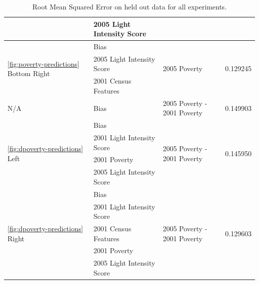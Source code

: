 \documentclass[10pt, letterpaper]{article}
\theoremstyle{plain}
\theoremstyle{definition}
\begin{document}
\begin{table}
\begin{tabular}{| l | l | l | l |}
                                                  & 2005 Light Intensity Score    &                               &                           \\
  \hline
  \multirow{3}{*}{\ref{fig:poverty-predictions} Bottom Right}  & Bias                          & \multirow{3}{*}{2005 Poverty} & \multirow{3}{*}{0.129245} \\
                                                  & 2005 Light Intensity Score    &                               &                           \\
                                                  & 2001 Census Features          &                               &                           \\
  \hline
  N/A                                             & Bias                          & 2005 Poverty - 2001 Poverty   & 0.149903                  \\
  \hline
  \multirow{4}{*}{\ref{fig:dpoverty-predictions} Left}        & Bias                          & \multirow{4}{*}{2005 Poverty - 2001 Poverty} & \multirow{4}{*}{0.145950} \\
                                                  & 2001 Light Intensity Score    &                               &                           \\
                                                  & 2001 Poverty                  &                               &                           \\
                                                  & 2005 Light Intensity Score    &                               &                           \\
  \hline
  \multirow{5}{*}{\ref{fig:dpoverty-predictions} Right}  & Bias                          & \multirow{5}{*}{2005 Poverty - 2001 Poverty} & \multirow{5}{*}{0.129603} \\
                                                  & 2001 Light Intensity Score    &                               &                           \\
                                                  & 2001 Census Features          &                               &                           \\
                                                  & 2001 Poverty                  &                               &                           \\
                                                  & 2005 Light Intensity Score    &                               &                           \\
  \hline
\end{tabular}
\caption{Root Mean Squared Error on held out data for all experiments.}
\label{tbl:results}
\end{table}
\end{document}
